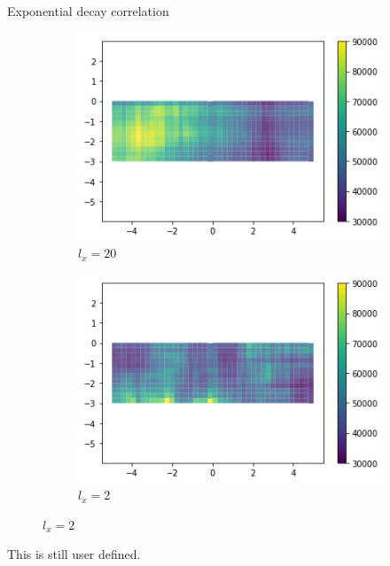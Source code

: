 \documentclass[dvipsnames]{beamer}
\begin{document}
	\begin{frame}{Exponential decay correlation}
	\begin{figure}
	\begin{subfigure}{.48\textwidth}
	\includegraphics[width=\textwidth]{images/correlation_20.png}
	\caption{$l_x = 20$}
	\end{subfigure}
	\begin{subfigure}{.48\textwidth}
	\includegraphics[width=\textwidth]{images/correlation_2.png}
	\caption{$l_x = 2$}
	\end{subfigure}
	\end{figure}
	\alert{This is still user defined.}
	\end{frame}
	
\end{document}
